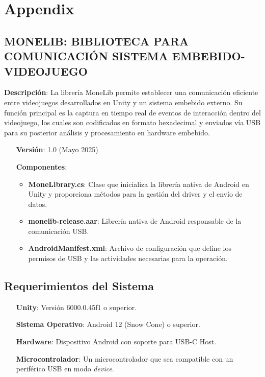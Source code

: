 \chapter{Appendix}


\section{MONELIB: BIBLIOTECA PARA COMUNICACIÓN SISTEMA EMBEBIDO-VIDEOJUEGO}

\label{apendice:monelib}

\textbf{Descripción}: La librería MoneLib permite establecer una comunicación eficiente entre videojuegos desarrollados en Unity y un sistema embebido externo. Su función principal es la captura en tiempo real de eventos de interacción dentro del videojuego, los cuales son codificados en formato hexadecimal y enviados vía USB para su posterior análisis y procesamiento en hardware embebido.


\begin{itemize}
    \item[\textbf{Versión}:] 1.0 (Mayo 2025)
    
    \item[\textbf{Componentes}:]
    
     \begin{itemize}
        \item \textbf{MoneLibrary.cs}: Clase que inicializa la librería nativa de Android en Unity y proporciona métodos para la gestión del driver y el envío de datos.
        \item \textbf{monelib-release.aar}: Librería nativa de Android responsable de la comunicación USB.
        \item \textbf{AndroidManifest.xml}: Archivo de configuración que define los permisos de USB y las actividades necesarias para la operación.
    \end{itemize}
\end{itemize}



\section{Requerimientos del Sistema}
\begin{itemize}
    \item[\textbf{Unity}:] Versión 6000.0.45f1 o superior.
    \item[\textbf{Sistema Operativo}:] Android 12 (Snow Cone) o superior.
    \item[\textbf{Hardware}:] Dispositivo Android con soporte para USB-C Host.
    \item[\textbf{Microcontrolador}:] Un microcontrolador que sea compatible con un periférico USB en modo \textit{device}.
\end{itemize}

